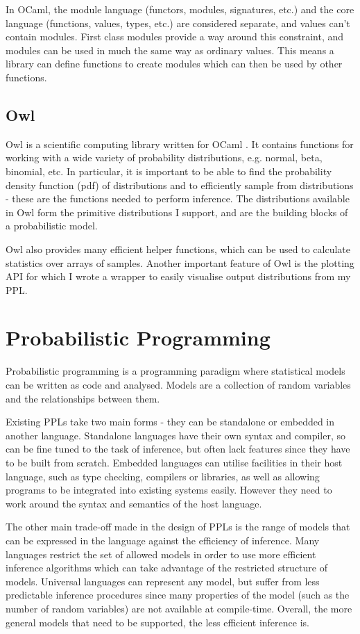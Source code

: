 In OCaml, the module language (functors, modules, signatures, etc.) and the core language (functions, values, types, etc.) are considered separate, and values can't contain modules. First class modules provide a way around this constraint, and modules can be used in much the same way as ordinary values. This means a library can define functions to create modules which can then be used by other functions.
		
\subsection{Owl}
			
Owl is a scientific computing library written for OCaml \cite{owl}. It contains functions for working with a wide variety of probability distributions, e.g. normal, beta, binomial, etc. In particular, it is important to be able to find the probability density function (pdf) of distributions and to efficiently sample from distributions - these are the functions needed to perform inference. The distributions available in Owl form the primitive distributions I support, and are the building blocks of a probabilistic model.
		
Owl also provides many efficient helper functions, which can be used to calculate statistics over arrays of samples. Another important feature of Owl is the plotting API for which I wrote a wrapper to easily visualise output distributions from my PPL.

\section{Probabilistic Programming}
Probabilistic programming is a programming paradigm where statistical models can be written as code and analysed. Models are a collection of random variables and the relationships between them. 

Existing PPLs take two main forms - they can be standalone or embedded in another language. Standalone languages have their own syntax and compiler, so can be fine tuned to the task of inference, but often lack features since they have to be built from scratch. Embedded languages can utilise facilities in their host language, such as type checking, compilers or libraries, as well as allowing programs to be integrated into existing systems easily. However they need to work around the syntax and semantics of the host language.
		
The other main trade-off made in the design of PPLs is the range of models that can be expressed in the language against the efficiency of inference. Many languages restrict the set of allowed models in order to use more efficient inference algorithms which can take advantage of the restricted structure of models. Universal languages can represent any model, but suffer from less predictable inference procedures since many properties of the model (such as the number of random variables) are not available at compile-time. Overall, the more general models that need to be supported, the less efficient inference is.
		
